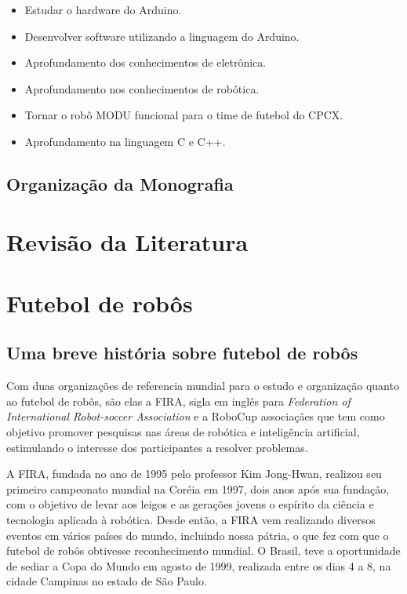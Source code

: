 \documentclass[a4paper,12pt,portuguese]{ufms-cpcx}
\begin{document}
\begin{itemize}
	
	\item Estudar o hardware do Arduino.
	\item Desenvolver software utilizando a linguagem do Arduino.
	\item Aprofundamento dos conhecimentos de eletrônica.
	\item Aprofundamento nos conhecimentos de robótica.
	\item Tornar o robô MODU funcional para o time de futebol do CPCX.
	\item Aprofundamento na linguagem C e C++.
	
	
\end{itemize}

\section {Organização da Monografia}

\chapter{Revisão da Literatura}

\chapter{Futebol de robôs}
%

\section{Uma breve história sobre futebol de robôs}
Com duas organizações de referencia mundial para o estudo e organização quanto ao futebol de robôs, são elas a FIRA, sigla em inglês para \textit{Federation of International Robot-soccer Association} e a RoboCup associaçães que tem como objetivo promover pesquisas nas áreas de robótica e inteligência artificial, estimulando o interesse dos participantes a resolver problemas. 

A FIRA, fundada no ano de 1995 pelo professor Kim Jong-Hwan, realizou seu primeiro campeonato mundial na Coréia em 1997, dois anos após sua fundação, com o objetivo de levar aos leigos e as gerações jovens o espírito da ciência e tecnologia aplicada à robótica. Desde então, a FIRA vem realizando diversos eventos em vários
países do mundo, incluindo nossa pátria, o que fez com que o futebol de robôs obtivesse reconhecimento mundial. O Brasil, teve a oportunidade de sediar a Copa do Mundo em agosto de 1999, realizada entre os dias 4 a 8, na cidade Campinas no estado de São Paulo.
\end{document}

